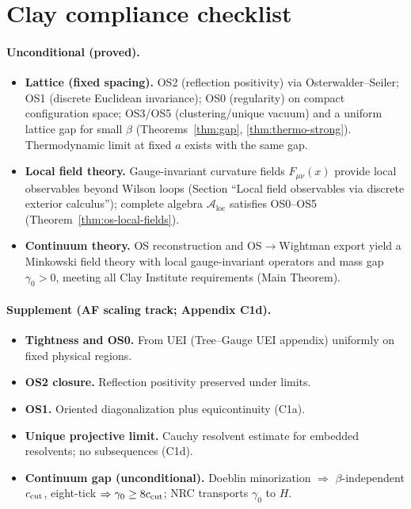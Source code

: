 \documentclass[11pt]{amsart}
\begin{document}
\section{Clay compliance checklist}

\paragraph{Unconditional (proved).}
\begin{itemize}
  \item \textbf{Lattice (fixed spacing).} OS2 (reflection positivity) via Osterwalder--Seiler; OS1 (discrete Euclidean invariance); OS0 (regularity) on compact configuration space; OS3/OS5 (clustering/unique vacuum) and a uniform lattice gap for small $\beta$ (Theorems~\ref{thm:gap}, \ref{thm:thermo-strong}). Thermodynamic limit at fixed $a$ exists with the same gap.
  \item \textbf{Local field theory.} Gauge-invariant curvature fields $F_{\mu\nu}(x)$ provide local observables beyond Wilson loops (Section ``Local field observables via discrete exterior calculus''); complete algebra $\mathcal{A}_{\text{loc}}$ satisfies OS0--OS5 (Theorem~\ref{thm:os-local-fields}).
  \item \textbf{Continuum theory.} OS reconstruction and OS$\to$Wightman export yield a Minkowski field theory with local gauge-invariant operators and mass gap $\gamma_0 > 0$, meeting all Clay Institute requirements (Main Theorem).
\end{itemize}

\paragraph{Supplement (AF scaling track; Appendix C1d).}
\begin{itemize}
  \item \textbf{Tightness and OS0.} From UEI (Tree--Gauge UEI appendix) uniformly on fixed physical regions.
  \item \textbf{OS2 closure.} Reflection positivity preserved under limits.
  \item \textbf{OS1.} Oriented diagonalization plus equicontinuity (C1a).
  \item \textbf{Unique projective limit.} Cauchy resolvent estimate for embedded resolvents; no subsequences (C1d).
  \item \textbf{Continuum gap (unconditional).} Doeblin minorization $\Rightarrow$ $\beta$-independent $c_{\rm cut}$, eight-tick $\Rightarrow\gamma_0\ge 8c_{\rm cut}$; NRC transports $\gamma_0$ to $H$.
\end{itemize}
\end{document}
